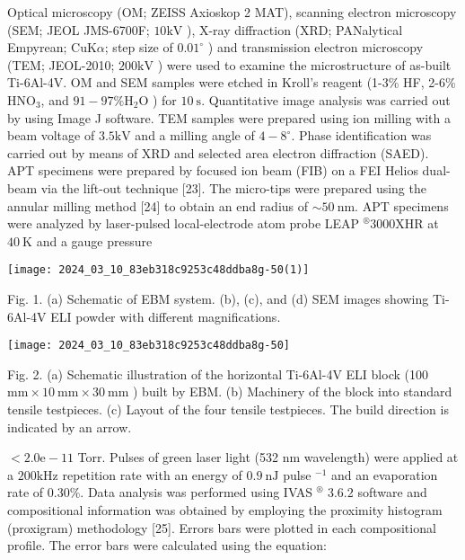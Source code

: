 \documentclass[10pt]{article}
\begin{document}
Optical microscopy (OM; ZEISS Axioskop 2 MAT), scanning electron microscopy (SEM; JEOL JMS-6700F; $10 \mathrm{kV}$ ), X-ray diffraction (XRD; PANalytical Empyrean; $\mathrm{Cu} \mathrm{K} \alpha$; step size of $0.01^{\circ}$ ) and transmission electron microscopy (TEM; JEOL-2010; $200 \mathrm{kV}$ ) were used to examine the microstructure of as-built Ti-6Al-4V. OM and SEM samples were etched in Kroll's reagent (1-3\% HF, 2-6\% $\mathrm{HNO}_{3}$, and $91-97 \% \mathrm{H}_{2} \mathrm{O}$ ) for $10 \mathrm{~s}$. Quantitative image analysis was carried out by using Image J software. TEM samples were prepared using ion milling with a beam voltage of $3.5 \mathrm{kV}$ and a milling angle of $4-8^{\circ}$. Phase identification was carried out by means of XRD and selected area electron diffraction (SAED). APT specimens were prepared by focused ion beam (FIB) on a FEI Helios dual-beam via the lift-out technique [23]. The micro-tips were prepared using the annular milling method [24] to obtain an end radius of $\sim 50 \mathrm{~nm}$. APT specimens were analyzed by laser-pulsed local-electrode atom probe LEAP $^{\circledR} 3000 \mathrm{X} \mathrm{HR}$ at $40 \mathrm{~K}$ and a gauge pressure

\begin{center}
\texttt{[image: 2024\_03\_10\_83eb318c9253c48ddba8g-50(1)]}
\end{center}

Fig. 1. (a) Schematic of EBM system. (b), (c), and (d) SEM images showing Ti-6Al-4V ELI powder with different magnifications.

\begin{center}
\texttt{[image: 2024\_03\_10\_83eb318c9253c48ddba8g-50]}
\end{center}

Fig. 2. (a) Schematic illustration of the horizontal Ti-6Al-4V ELI block (100 $\mathrm{mm} \times 10 \mathrm{~mm} \times 30 \mathrm{~mm}$ ) built by EBM. (b) Machinery of the block into standard tensile testpieces. (c) Layout of the four tensile testpieces. The build direction is indicated by an arrow.

$<2.0 \mathrm{e}-11$ Torr. Pulses of green laser light (532 nm wavelength) were applied at a $200 \mathrm{kHz}$ repetition rate with an energy of $0.9 \mathrm{~nJ}$ pulse $^{-1}$ and an evaporation rate of $0.30 \%$. Data analysis was performed using IVAS ${ }^{\circledR}$ 3.6.2 software and compositional information was obtained by employing the proximity histogram (proxigram) methodology [25]. Errors bars were plotted in each compositional profile. The error bars were calculated using the equation:
\end{document}

